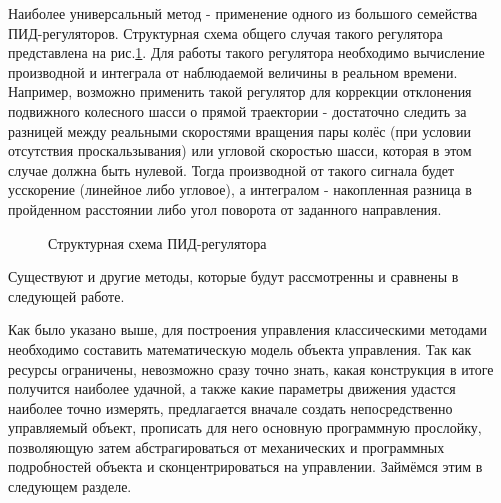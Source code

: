 \documentclass[14pt,a4paper,russian]{scrartcl}
\begin{document}
Наиболее универсальный метод - применение одного из большого семейства ПИД-регуляторов.
Структурная схема общего случая такого регулятора представлена на рис.\ref{fig:pidor}.
Для работы такого регулятора необходимо вычисление производной и интеграла
от наблюдаемой величины в реальном времени. Например, возможно применить
такой регулятор для коррекции отклонения подвижного колесного шасси о прямой траектории - 
достаточно следить за разницей между реальными скоростями вращения пары колёс
(при условии отсутствия проскальзывания) или угловой скоростью шасси, которая в этом случае
должна быть нулевой. Тогда производной от такого сигнала будет усскорение (линейное либо угловое),
а интегралом - накопленная разница в пройденном расстоянии либо угол поворота от
заданного направления.
\begin{figure}[h]
    \caption{Структурная схема ПИД-регулятора}
    \label{fig:pidor}
\end{figure}

Существуют и другие методы, которые будут рассмотренны и сравнены в следующей работе.

Как было указано выше, для построения управления классическими методами
необходимо составить математическую модель объекта управления. Так как
ресурсы ограничены, невозможно сразу точно знать, какая конструкция
в итоге получится наиболее удачной, а также какие параметры движения
удастся наиболее точно измерять, предлагается вначале создать
непосредственно управляемый объект, прописать для него основную программную прослойку,
позволяющую затем абстрагироваться от механических и программных подробностей
объекта и сконцентрироваться на управлении. Займёмся этим в следующем разделе.


\newpage
\end{document}
